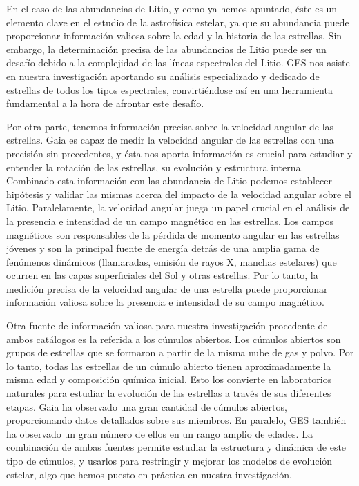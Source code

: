En el caso de las abundancias de Litio, y como ya hemos apuntado, éste es un elemento clave en el estudio de la astrofísica estelar, ya que su abundancia puede proporcionar información valiosa sobre la edad y la historia de las estrellas. Sin embargo, la determinación precisa de las abundancias de Litio puede ser un desafío debido a la complejidad de las líneas espectrales del Litio. GES nos asiste en nuestra investigación aportando su análisis especializado y dedicado de estrellas de todos los tipos espectrales, convirtiéndose así en una herramienta fundamental a la hora de afrontar este desafío.\par

Por otra parte, tenemos información precisa sobre la velocidad angular de las estrellas. Gaia es capaz de medir la velocidad angular de las estrellas con una precisión sin precedentes, y ésta nos aporta información es crucial para estudiar y entender la rotación de las estrellas, su evolución y estructura interna. Combinado esta información con las abundancia de Litio podemos establecer hipótesis y validar las mismas acerca del impacto de la velocidad angular sobre el Litio. Paralelamente, la velocidad angular juega un papel crucial en el análisis de la presencia e intensidad de un campo magnético en las estrellas. Los campos magnéticos son responsables de la pérdida de momento angular en las estrellas jóvenes y son la principal fuente de energía detrás de una amplia gama de fenómenos dinámicos (llamaradas, emisión de rayos X, manchas estelares) que ocurren en las capas superficiales del Sol y otras estrellas. Por lo tanto, la medición precisa de la velocidad angular de una estrella puede proporcionar información valiosa sobre la presencia e intensidad de su campo magnético.\par

Otra fuente de información valiosa para nuestra investigación procedente de ambos catálogos es la referida a los cúmulos abiertos. Los cúmulos abiertos son grupos de estrellas que se formaron a partir de la misma nube de gas y polvo. Por lo tanto, todas las estrellas de un cúmulo abierto tienen aproximadamente la misma edad y composición química inicial. Esto los convierte en laboratorios naturales para estudiar la evolución de las estrellas a través de sus diferentes etapas. Gaia ha observado una gran cantidad de cúmulos abiertos, proporcionando datos detallados sobre sus miembros. En paralelo, GES también ha observado un gran número de ellos en un rango amplio de edades. La combinación de ambas fuentes permite estudiar la estructura y dinámica de este tipo de cúmulos, y usarlos para restringir y mejorar los modelos de evolución estelar, algo que hemos puesto en práctica en nuestra investigación.\par

